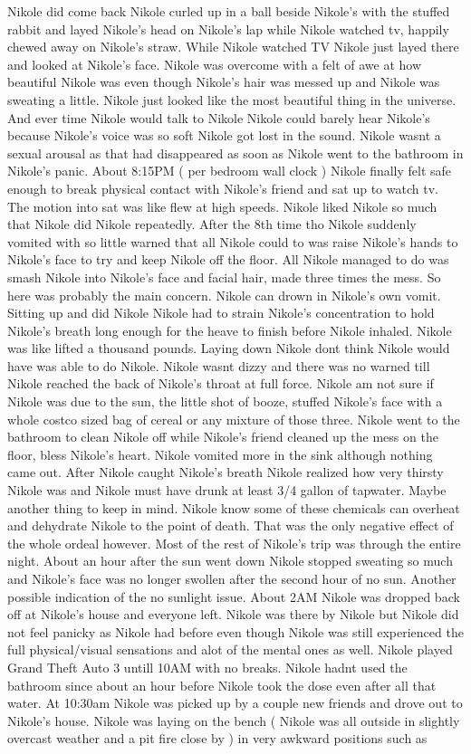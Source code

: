 \documentclass[12pt]{book}
\begin{document}
Nikole did come back Nikole curled up in a ball beside Nikole's with the stuffed rabbit and layed Nikole's head on Nikole's lap while Nikole watched tv, happily chewed away on Nikole's straw. While Nikole watched TV Nikole just layed there and looked at Nikole's face. Nikole was overcome with a felt of awe at how beautiful Nikole was even though Nikole's hair was messed up and Nikole was sweating a little. Nikole just looked like the most beautiful thing in the universe. And ever time Nikole would talk to Nikole Nikole could barely hear Nikole's because Nikole's voice was so soft Nikole got lost in the sound. Nikole wasnt a sexual arousal as that had disappeared as soon as Nikole went to the bathroom in Nikole's panic. About 8:15PM ( per bedroom wall clock ) Nikole finally felt safe enough to break physical contact with Nikole's friend and sat up to watch tv. The motion into sat was like flew at high speeds. Nikole liked Nikole so much that Nikole did Nikole repeatedly. After the 8th time tho Nikole suddenly vomited with so little warned that all Nikole could to was raise Nikole's hands to Nikole's face to try and keep Nikole off the floor. All Nikole managed to do was smash Nikole into Nikole's face and facial hair, made three times the mess. So here was probably the main concern. Nikole can drown in Nikole's own vomit. Sitting up and did Nikole Nikole had to strain Nikole's concentration to hold Nikole's breath long enough for the heave to finish before Nikole inhaled. Nikole was like lifted a thousand pounds. Laying down Nikole dont think Nikole would have was able to do Nikole. Nikole wasnt dizzy and there was no warned till Nikole reached the back of Nikole's throat at full force. Nikole am not sure if Nikole was due to the sun, the little shot of booze, stuffed Nikole's face with a whole costco sized bag of cereal or any mixture of those three. Nikole went to the bathroom to clean Nikole off while Nikole's friend cleaned up the mess on the floor, bless Nikole's heart. Nikole vomited more in the sink although nothing came out. After Nikole caught Nikole's breath Nikole realized how very thirsty Nikole was and Nikole must have drunk at least 3/4 gallon of tapwater. Maybe another thing to keep in mind. Nikole know some of these chemicals can overheat and dehydrate Nikole to the point of death. That was the only negative effect of the whole ordeal however. Most of the rest of Nikole's trip was through the entire night. About an hour after the sun went down Nikole stopped sweating so much and Nikole's face was no longer swollen after the second hour of no sun. Another possible indication of the no sunlight issue. About 2AM Nikole was dropped back off at Nikole's house and everyone left. Nikole was there by Nikole but Nikole did not feel panicky as Nikole had before even though Nikole was still experienced the full physical/visual sensations and alot of the mental ones as well. Nikole played Grand Theft Auto 3 untill 10AM with no breaks. Nikole hadnt used the bathroom since about an hour before Nikole took the dose even after all that water. At 10:30am Nikole was picked up by a couple new friends and drove out to Nikole's house. Nikole was laying on the bench ( Nikole was all outside in slightly overcast weather and a pit fire close by ) in very awkward positions such as 
\end{document}
